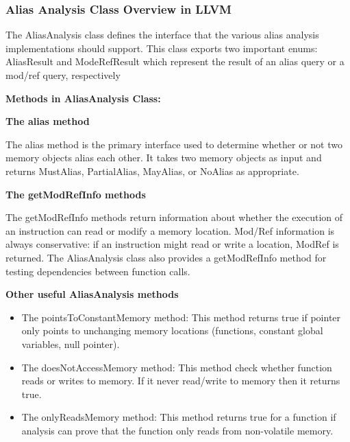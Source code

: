\subsubsection{Alias Analysis Class Overview in LLVM}

The AliasAnalysis class defines the interface that the various alias analysis implementations should
support. This class exports two important enums: AliasResult and ModeRefResult which represent
the result of an alias query or a mod/ref query, respectively


\vspace{1\baselineskip}
\textbf{\large Methods in AliasAnalysis Class:}


\vspace{1\baselineskip}


\textbf{\large The alias method}


\vspace{1\baselineskip}

The alias method is the primary interface used to determine whether or not two memory objects alias
each other. It takes two memory objects as input and returns MustAlias, PartialAlias, MayAlias,
or NoAlias as appropriate.

\vspace{1\baselineskip}

\textbf{\large The getModRefInfo methods}

\vspace{1\baselineskip}


The getModRefInfo methods return information about whether the execution of an instruction can
read or modify a memory location. Mod/Ref information is always conservative: if an instruction might read or write a location, ModRef is returned. The AliasAnalysis class also provides a
getModRefInfo method for testing dependencies between function calls.


\textbf{\large Other useful AliasAnalysis methods}



\begin{itemize}


 \item The pointsToConstantMemory method: This method returns true if pointer only points to
unchanging memory locations (functions, constant global variables, null pointer).
 \item The doesNotAccessMemory method: This method check whether function reads or writes to
memory. If it never read/write to memory then it returns true.
 \item The onlyReadsMemory method: This method returns true for a function if analysis can prove
that the function only reads from non-volatile memory.

\end{itemize}


